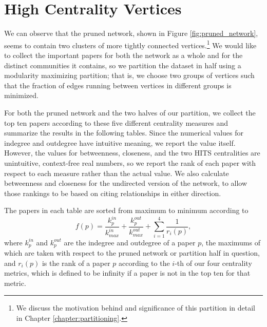 \documentclass[12pt]{thesis}
\theoremstyle{plain}
\theoremstyle{definition}
\theoremstyle{remark}
\begin{document}
\section{High Centrality Vertices}\label{section:high_centrality_vertices}

We can observe that the pruned network, shown in Figure \ref{fig:pruned_network}, seems to contain two clusters of more tightly connected vertices.\footnote{We discuss the motivation behind and significance of this partition in detail in Chapter \ref{chapter:partitioning}.} We would like to collect the important papers for both the network as a whole and for the distinct communities it contains, so we partition the dataset in half using a modularity maximizing partition; that is, we choose two groups of vertices such that the fraction of edges running between vertices in different groups is minimized.

For both the pruned network and the two halves of our partition, we collect the top ten papers according to these five different centrality measures and summarize the results in the following tables. Since the numerical values for indegree and outdegree have intuitive meaning, we report the value itself. However, the values for betweenness, closeness, and the two HITS centralities are unintuitive, context-free real numbers, so we report the rank of each paper with respect to each measure rather than the actual value. We also calculate betweenness and closeness for the undirected version of the network, to allow those rankings to be based on citing relationships in either direction.

The papers in each table are sorted from maximum to minimum according to \[ f(p) = \frac{k^{in}_p}{k^{in}_{max}} + \frac{k^{out}_p}{ k^{out}_{max}} + \sum_{i=1}^4 \frac{1}{r_i(p)}, \] where $k^{in}_p$ and $k^{out}_p$ are the indegree and outdegree of a paper $p$, the maximums of which are taken with respect to the pruned network or partition half in question, and $r_i(p)$ is the rank of a paper $p$ according to the $i$-th of our four centrality metrics, which is defined to be infinity if a paper is not in the top ten for that metric.
 
\end{document}
